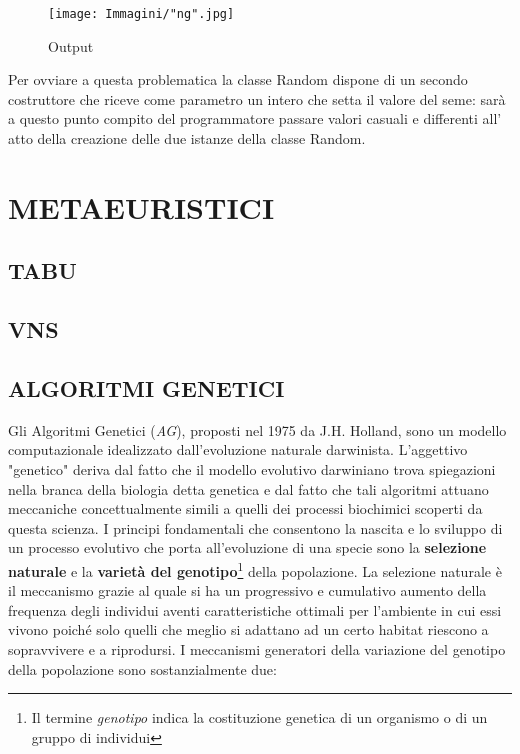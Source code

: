 \documentclass[11pt]{article}
\begin{document}
\begin{figure}[htbp]
    \centering
    \texttt{[image: Immagini/"ng".jpg]}
    \caption{Output}
\end{figure}

Per ovviare a questa problematica la classe Random dispone di un secondo costruttore che riceve come parametro un intero che setta il valore del seme: sarà a questo punto compito del programmatore passare valori casuali e  differenti all' atto della creazione delle due istanze della classe Random.


\section*{METAEURISTICI}

\subsection*{TABU}

\subsection*{VNS}

\subsection*{ALGORITMI GENETICI}

Gli Algoritmi Genetici (\textit{AG}), proposti nel 1975 da J.H. Holland, sono un modello computazionale idealizzato dall'evoluzione naturale darwinista. L'aggettivo "genetico" deriva dal fatto che il modello evolutivo darwiniano trova spiegazioni nella branca della biologia detta genetica e dal fatto che tali algoritmi attuano meccaniche concettualmente simili a quelli dei processi biochimici scoperti da questa scienza. I principi fondamentali che consentono la nascita e lo sviluppo di un processo evolutivo che porta all'evoluzione di una specie sono la \textbf{selezione naturale} e la \textbf{varietà del genotipo}\footnote{Il termine \textit{genotipo} indica la costituzione genetica di un organismo o di un gruppo di individui} della popolazione.
La selezione naturale è il meccanismo grazie al quale si ha un progressivo e cumulativo aumento della frequenza degli individui aventi caratteristiche ottimali per l'ambiente in cui essi vivono poiché solo quelli che meglio si adattano ad un certo habitat riescono a sopravvivere e a riprodursi.
I meccanismi generatori della variazione del genotipo della popolazione sono sostanzialmente due:
\end{document}

